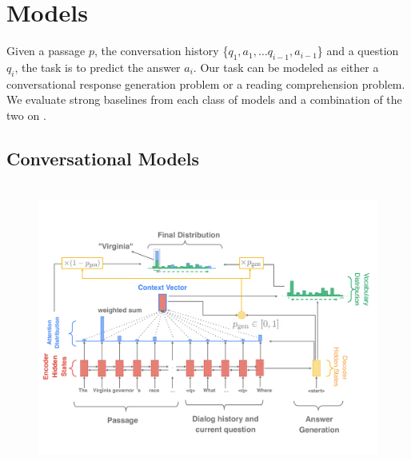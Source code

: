 
\section{Models}
\label{sec:coqa-models}

Given a passage $p$, the conversation history \{$q_1, a_1, \ldots q_{i-1}, a_{i-1}$\} and a question $q_i$, the task is to predict the answer ${a_i}$. Our task can be modeled as either a conversational response generation problem or a reading comprehension problem. We evaluate strong baselines from each class of models and a combination of the two on .

\subsection{Conversational Models}

\begin{figure}[!t]
\begin{center}
\includegraphics[height=9.5cm]{img/coqa_pgnet.pdf}
\end{center}
\end{figure}


